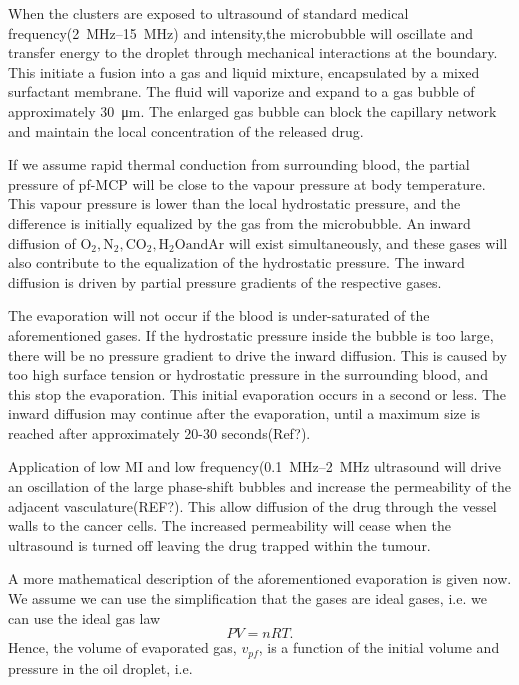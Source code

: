 When the clusters are exposed to ultrasound of standard medical frequency(\SIrange{2}{15}{\mega\hertz}\cite{Hoskins2010}) and intensity,the microbubble will oscillate and transfer energy to the droplet through mechanical interactions at the boundary. This initiate a fusion into a gas and liquid mixture, encapsulated by a mixed surfactant membrane. The fluid will vaporize and expand to a gas bubble of approximately \SI{30}{\micro\metre}. The enlarged gas bubble can block the capillary network and maintain the local concentration of the released drug. 

If we assume rapid thermal conduction from surrounding blood, the partial pressure of pf-MCP will be close to the vapour pressure at body temperature. This vapour pressure is lower than the local hydrostatic pressure, and the difference is initially equalized by the gas from the microbubble. An inward diffusion of $\mathrm{O_2, N_2, CO_2, H_2O and Ar}$ will exist simultaneously, and these gases will also contribute to the equalization of the hydrostatic pressure. The inward diffusion is driven by partial pressure gradients of the respective gases. 

The evaporation will not occur if the blood is under-saturated of the aforementioned gases. If the hydrostatic pressure inside the bubble is too large, there will be no pressure gradient to drive the inward diffusion. This is caused by too high surface tension or hydrostatic pressure in the surrounding blood, and this stop the evaporation. This initial evaporation occurs in a second or less\cite{Healey2013}. The inward diffusion may continue after the evaporation, until a maximum size is reached after approximately 20-30 seconds(Ref?).

Application of low MI and low frequency(\SIrange{0.1}{2}{\mega\hertz} ultrasound will drive an oscillation of the large phase-shift bubbles and increase the permeability of the adjacent vasculature(REF?). This allow diffusion of the drug through the vessel walls to the cancer cells. The increased permeability will cease when the ultrasound is turned off leaving the drug trapped within the tumour.

A more mathematical description of the aforementioned evaporation is given now\cite{Healey2013}. We assume we can use the simplification that the gases are ideal gases, i.e. we can use the ideal gas law
\begin{equation}
\label{ideal gas law}
 PV = nRT. 
\end{equation}  
Hence, the volume of evaporated gas, $v_{pf}$, is a function of the initial volume and pressure in the oil droplet, i.e.

